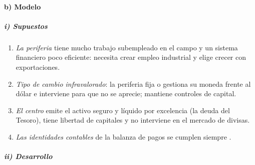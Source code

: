 \documentclass[11pt]{article}
\begin{document}
\paragraph{b) Modelo}

\subparagraph{i) Supuestos}

\begin{enumerate}
\item \emph{La periferia} tiene mucho trabajo subempleado en el campo y un sistema financiero poco eficiente: necesita crear empleo industrial y elige crecer con exportaciones.
\item \emph{Tipo de cambio infravalorado}: la periferia fija o gestiona su moneda frente al dólar e interviene para que no se aprecie; mantiene controles de capital.
\item \emph{El centro} emite el activo seguro y líquido por excelencia (la deuda del Tesoro), tiene libertad de capitales y no interviene en el mercado de divisas.
\item \emph{Las identidades contables} de la balanza de pagos se cumplen siempre .
\end{enumerate}

\subparagraph{ii) Desarrollo}
\end{document}
